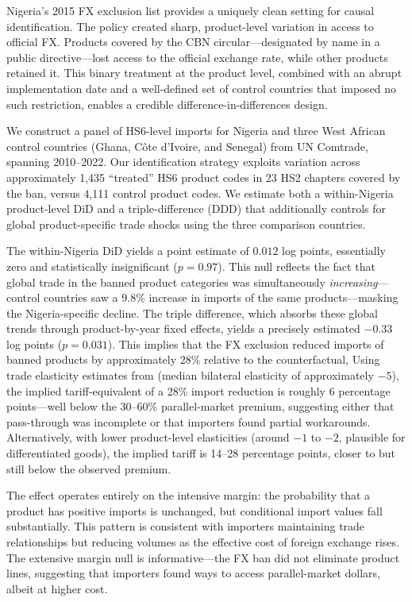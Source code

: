 \documentclass[12pt]{article}
\begin{document}
Nigeria's 2015 FX exclusion list provides a uniquely clean setting for causal identification. The policy created sharp, product-level variation in access to official FX. Products covered by the CBN circular---designated by name in a public directive---lost access to the official exchange rate, while other products retained it. This binary treatment at the product level, combined with an abrupt implementation date and a well-defined set of control countries that imposed no such restriction, enables a credible difference-in-differences design.

We construct a panel of HS6-level imports for Nigeria and three West African control countries (Ghana, C\^{o}te d'Ivoire, and Senegal) from UN Comtrade, spanning 2010--2022. Our identification strategy exploits variation across approximately 1,435 ``treated'' HS6 product codes in 23 HS2 chapters covered by the ban, versus 4,111 control product codes. We estimate both a within-Nigeria product-level DiD and a triple-difference (DDD) that additionally controls for global product-specific trade shocks using the three comparison countries.

The within-Nigeria DiD yields a point estimate of $0.012$ log points, essentially zero and statistically insignificant ($p = 0.97$). This null reflects the fact that global trade in the banned product categories was simultaneously \textit{increasing}---control countries saw a 9.8\% increase in imports of the same products---masking the Nigeria-specific decline. The triple difference, which absorbs these global trends through product-by-year fixed effects, yields a precisely estimated $-0.33$ log points ($p = 0.031$). This implies that the FX exclusion reduced imports of banned products by approximately 28\% relative to the counterfactual, Using trade elasticity estimates from \citet{caliendo_parro_2015} (median bilateral elasticity of approximately $-5$), the implied tariff-equivalent of a 28\% import reduction is roughly 6 percentage points---well below the 30--60\% parallel-market premium, suggesting either that pass-through was incomplete or that importers found partial workarounds. Alternatively, with lower product-level elasticities (around $-1$ to $-2$, plausible for differentiated goods), the implied tariff is 14--28 percentage points, closer to but still below the observed premium.

The effect operates entirely on the intensive margin: the probability that a product has positive imports is unchanged, but conditional import values fall substantially. This pattern is consistent with importers maintaining trade relationships but reducing volumes as the effective cost of foreign exchange rises. The extensive margin null is informative---the FX ban did not eliminate product lines, suggesting that importers found ways to access parallel-market dollars, albeit at higher cost.
\end{document}
